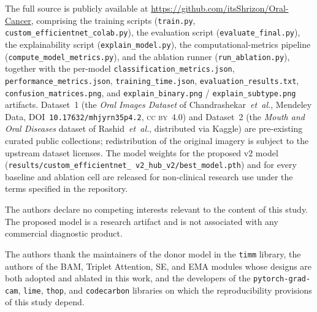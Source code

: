 
The full source is publicly available at
\url{https://github.com/itsShrizon/Oral-Cancer},
comprising the training scripts (\texttt{train.py},
\texttt{custom\_efficientnet\_colab.py}), the evaluation script
(\texttt{evaluate\_final.py}), the explainability script
(\texttt{explain\_model.py}), the computational-metrics pipeline
(\texttt{compute\_model\_metrics.py}), and the ablation runner
(\texttt{run\_ablation.py}), together with the per-model
\texttt{classification\_metrics.json},
\texttt{performance\_metrics.json}, \texttt{training\_time.json},
\texttt{evaluation\_results.txt}, \texttt{confusion\_matrices.png}, and
\texttt{explain\_binary.png} / \texttt{explain\_subtype.png} artifacts.
Dataset~1 (the \emph{Oral Images Dataset} of Chandrashekar~\textit{et~al.},
Mendeley Data, DOI~\texttt{10.17632/mhjyrn35p4.2}, \textsc{cc by}~4.0)
\cite{chandrashekar2021oral} and Dataset~2 (the \emph{Mouth and Oral
Diseases} dataset of Rashid~\textit{et~al.}, distributed via Kaggle)
\cite{rashid2022mod,ref19} are pre-existing curated public collections;
redistribution of the original imagery is subject to the upstream dataset
licenses. The model weights for the proposed v2 model
(\texttt{results/\allowbreak custom\_\allowbreak efficientnet\_\allowbreak
v2\_\allowbreak hub\_\allowbreak v2/\allowbreak best\_\allowbreak model.pth})
and for every baseline and ablation cell are released for non-clinical
research use under the terms specified in the repository.


The authors declare no competing interests relevant to the content of this
study. The proposed model is a research artifact and is not associated
with any commercial diagnostic product.


The authors thank the maintainers of the donor model in the \texttt{timm}
library, the authors of the BAM, Triplet Attention, SE, and EMA modules
whose designs are both adopted and ablated in this work, and the
developers of the \texttt{pytorch-grad-cam}, \texttt{lime}, \texttt{thop},
and \texttt{codecarbon} libraries on which the reproducibility provisions
of this study depend.
